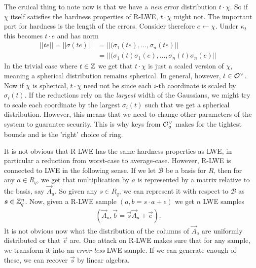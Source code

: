     The cruical thing to note now is that we have a \emph{new} error distribution \(t\cdot\chi\). So if \(\chi\) itself satisfies the hardness properties of R-LWE, \(t\cdot\chi\) might not. The important part for hardness is the length of the errors. Consider therefore \(e\leftarrow\chi\). Under \(\kappa_t\) this becomes \(t\cdot e\) and has norm
    \begin{equation*}
        \begin{split}
            ||te|| = ||\sigma(te)|| & = ||(\sigma_1(te),\dots ,\sigma_n(te)||\\
                                    & = ||(\sigma_1(t)\sigma_1(e), \dots ,\sigma_n(t)\sigma_n(e)|| 
        \end{split}
    \end{equation*}
    In the trivial case where \(t\in\mathbb{Z}\) we get that \(t\cdot\chi\) is just a scaled version of \(\chi\), meaning a spherical distribution remains spherical. In general, however, \(t\in\mathcal{O}^\vee\). Now if \(\chi\) is spherical, \(t\cdot\chi\) need not be since each \(i\)-th coordinate is scaled by \(\sigma_i(t)\). If the reductions rely on the \emph{largest} width of the Gaussians, we might try to scale each coordinate by the largest \(\sigma_i(t)\) such that we get a spherical distribution. However, this means that we need to change other parameters of the system to guarantee security. This is why keys from \(\mathcal{O}_q^\vee\) makes for the tightest bounds and is the 'right' choice of ring.\par
    
    It is not obvious that R-LWE has the same hardness-properties as LWE, in particular a reduction from worst-case to average-case. However, R-LWE is connected to LWE in the following sense. If we let \(\mathcal{B}\) be a basis for \(R\), then for any \(a\in R_q\), we get that multiplication by \(a\) is represented by a matrix relative to the basis, say \(\vec{A}_a\). So given any \(s\in R_q\), we can represent it with respect to \(\mathcal{B}\) as \(\boldsymbol{s}\in \mathbb{Z}_q^n\). Now, given a R-LWE sample \((a, b = s\cdot a + e)\) we get \(n\) LWE samples
    \begin{align*}
        (\vec{A}_a, \vec{b} = \vec{s}\vec{A}_a + \vec{e}).
    \end{align*}
    It is not obvious now what the distribution of the columns of \(\vec{A}_a\) are uniformly distributed or that \(\vec{e}\) are. One attack on R-LWE makes sure that for any sample, we transform it into an \emph{error-less} LWE-sample. If we can generate enough of these, we can recover \(\vec{s}\) by linear algebra. \par
    
